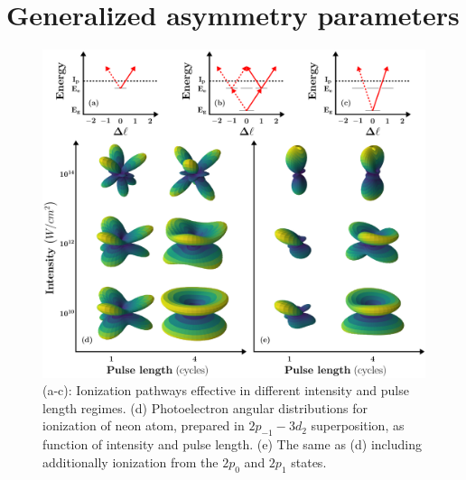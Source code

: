 \section*{Generalized asymmetry parameters}

\begin{figure}[t]
\begin{center}
    \includegraphics[width=0.9\linewidth]{figs/Photo_ionization/GAP/combine_fig_1.pdf}
\end{center}
\caption{
(a-c): Ionization pathways effective in different intensity and pulse length regimes. (d) Photoelectron angular distributions for ionization of neon atom, prepared in $2p_{-1}-3d_2$ superposition, as function of intensity and pulse length. (e) The same as (d) including additionally ionization from the $2p_0$ and $2p_1$ states.
} 
  \label{fig:scheme_GAP_lin}
\end{figure}

